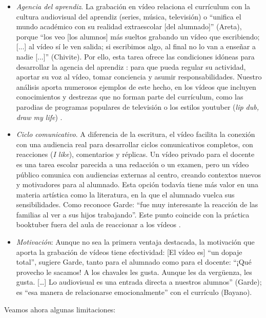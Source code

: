 \documentclass[spanish]{textolivre}
\begin{document}
\begin{itemize}
    \item \textit{Agencia del aprendiz}. La grabación en vídeo relaciona el currículum con la cultura audiovisual del aprendiz (series, música, televisión) o “unifica el mundo académico con su realidad extraescolar [del alumnado]” (Areta), porque “los veo [los alumnos] más sueltos grabando un vídeo que escribiendo; [...] al vídeo sí le ven salida; si escribimos algo, al final no lo van a enseñar a nadie [...]” (Chivite). Por ello, esta tarea ofrece las condiciones idóneas para desarrollar la agencia del aprendiz \cite{biesta_agency_2007}: para que pueda regular su actividad, aportar su voz al vídeo, tomar conciencia y asumir responsabilidades. Nuestro análisis aporta numerosos ejemplos de este hecho, en los vídeos que incluyen conocimientos y destrezas que no forman parte del currículum, como las parodias de programas populares de televisión o los estilos youtuber (\textit{lip dub, draw my life}) \cite{ogrady_developing_2022}.
    \item \textit{Ciclo comunicativo}. A diferencia de la escritura, el vídeo facilita la conexión con una audiencia real para desarrollar ciclos comunicativos completos, con reacciones (\textit{I like}), comentarios y réplicas. Un vídeo privado para el docente es una tarea escolar parecida a una redacción o un examen, pero un vídeo público comunica con audiencias externas al centro, creando contextos nuevos y motivadores para al alumnado. Esta opción todavía tiene más valor en una materia artística como la literatura, en la que el alumnado vuelca sus sensibilidades. Como reconoce Garde: “fue muy interesante la reacción de las familias al ver a sus hijos trabajando”. Este punto coincide con la práctica booktuber fuera del aula de reaccionar a los vídeos \cite{fialho_booktubers_2023,tomasena_glennie_booktubers_2020}.
    \item \textit{Motivación}: Aunque no sea la primera ventaja destacada, la motivación que aporta la grabación de vídeos tiene efectividad: [El vídeo es] “un dopaje total”, sugiere Garde, tanto para el alumnado como para el docente: “¡Qué provecho le sacamos! A los chavales les gusta. Aunque les da vergüenza, les gusta. […] Lo audiovisual es una entrada directa a nuestros alumnos” (Garde); es “esa manera de relacionarse emocionalmente” con el currículo (Bayano).
\end{itemize}

Veamos ahora algunas limitaciones:
\end{document}
